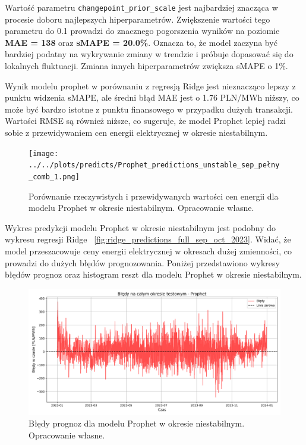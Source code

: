 Wartość parametru \texttt{changepoint\_prior\_scale} jest najbardziej znacząca w procesie doboru najlepszych hiperparametrów. Zwiększenie wartości tego parametru do 0.1 prowadzi do znacznego pogorszenia wyników na poziomie \textbf{MAE = 138} oraz \textbf{sMAPE = 20.0\%}. Oznacza to, że model zaczyna być bardziej podatny na wykrywanie zmiany w trendzie i próbuje dopasować się do lokalnych fluktuacji. Zmiana innych hiperparametrów zwiększa sMAPE o 1\%.

Wynik modelu prophet w porównaniu z regresją Ridge jest nieznacząco lepszy z punktu widzenia sMAPE, ale średni błąd MAE jest o 1.76 PLN/MWh niższy, co może być bardzo istotne z punktu finansowego w przypadku dużych transakcji. Wartości RMSE są również niższe, co sugeruje, że model Prophet lepiej radzi sobie z przewidywaniem cen energii elektrycznej w okresie niestabilnym.

\begin{figure}[H]
    \centering
    \texttt{[image: ../../plots/predicts/Prophet\_predictions\_unstable\_sep\_pełny\_comb\_1.png]}
    \caption{Porównanie rzeczywistych i przewidywanych wartości cen energii dla modelu Prophet w okresie niestabilnym. Opracowanie własne.}
    \label{fig:prophet_predictions_non_stable_period}
\end{figure}

Wykres predykcji modelu Prophet w okresie niestabilnym jest podobny do wykresu regresji Ridge ~\ref{fig:ridge_predictions_full_sep_oct_2023}. Widać, że model przeszacowuje ceny energii elektrycznej w okresach dużej zmienności, co prowadzi do dużych błędów prognozowania.\newline
Poniżej przedstawiono wykresy błędów prognoz oraz histogram reszt dla modelu Prophet w okresie niestabilnym.

\begin{figure}[H]
    \centering
    \includegraphics[width=1.0\textwidth]{../../plots/predicts/errors_over_time_Prophet_non_stable.png}
    \caption{Błędy prognoz dla modelu Prophet w okresie niestabilnym. Opracowanie własne.}
    \label{fig:prophet_errors_non_stable_period}
\end{figure}

